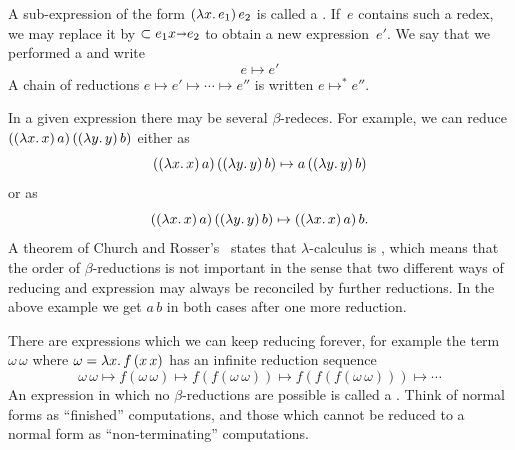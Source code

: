 A sub-expression of the form $(\lambda x .\,e_1)\, e_2$ is called a .
If~$e$ contains such a redex, we may replace it by $\subset{e_1}{x {\shortrightarrow}e_2}$ to obtain a new expression~$e'$. We say that we performed a  and write
%
\begin{equation*}
  e \mapsto e'
\end{equation*}
%
A chain of reductions $e \mapsto e' \mapsto \cdots \mapsto e''$ is written $e \mapsto^* e''$.

In a given expression there may be several $\beta$-redeces. For example, we can reduce
$((\lambda x .\,x)\, a)\,((\lambda y .\,y)\,b)$ either as
%
\begin{equation*}
  ((\lambda x .\,x)\, a)\,((\lambda y .\,y)\,b) \mapsto a\, ((\lambda y .\,y)\,b)
\end{equation*}
%
or as
%
\begin{equation*}
  ((\lambda x .\,x)\, a)\,((\lambda y .\,y)\,b) \mapsto ((\lambda x .\,x)\, a)\, b.
\end{equation*}
%
A theorem of Church and Rosser's~ states that
$\lambda$-calculus is , which means that the order of
$\beta$-reductions is not important in the sense that two different ways of
reducing and expression may always be reconciled by further reductions.
In the above example we get $a\,b$ in both cases after one more reduction.

There are expressions which we can keep reducing forever, for example
the term $\omega\,\omega$ where $\omega = \lambda x .\,f\,(x\,x)$ has an
infinite reduction sequence
%
\begin{equation*}
  \omega\, \omega \mapsto
  f(\omega\, \omega) \mapsto 
  f(f(\omega\, \omega)) \mapsto 
  f(f(f(\omega\, \omega))) \mapsto
  \cdots
\end{equation*}
%
An expression in which no $\beta$-reductions are possible is called a
. Think of normal forms as ``finished''
computations, and those which cannot be reduced to a normal form as
``non-terminating'' computations.

